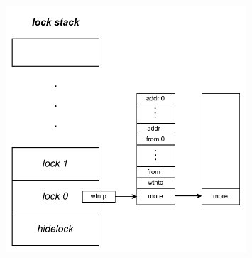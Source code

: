 {    \begin{figure}[!htbp]
        \centering
        \includegraphics[width=0.80\textwidth]{Img/JIAJIA锁栈结构.drawio.pdf}
        \label{fig:JIAJIA-lockstack}
    \end{figure}

    

}
